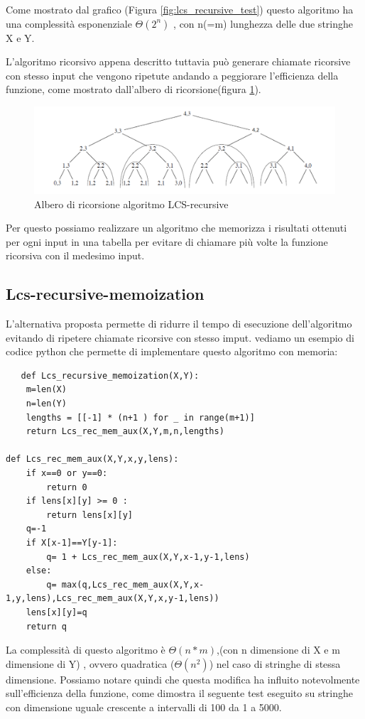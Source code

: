 \documentclass[11pt,a4paper]{article}
\begin{document}
Come mostrato dal grafico (Figura \ref{fig:lcs_recursive_test}) questo algoritmo ha una complessità esponenziale $\Theta(2^n)$ , con n(=m) lunghezza delle due stringhe X e  Y.

L'algoritmo ricorsivo appena descritto tuttavia può generare chiamate ricorsive con stesso input che vengono ripetute andando a peggiorare l'efficienza della funzione, come mostrato dall'albero di ricorsione(figura \ref{fig:lcs_recursion_tree}).

\begin{figure}[htbp]
    \centering
    \includegraphics[width=\textwidth]{Lcs recursion tree.png}
    \caption{Albero di ricorsione algoritmo LCS-recursive}
    \label{fig:lcs_recursion_tree}
\end{figure}

Per questo possiamo realizzare un algoritmo che memorizza i risultati ottenuti per ogni input in una tabella per evitare di chiamare più volte la funzione ricorsiva con il medesimo input.
\subsection{Lcs-recursive-memoization}
L'alternativa proposta permette di ridurre il tempo di esecuzione dell'algoritmo evitando di ripetere chiamate ricorsive con stesso imput. vediamo un esempio di codice python che permette di implementare questo algoritmo con memoria:
\newpage
\begin{lstlisting}
   def Lcs_recursive_memoization(X,Y):
    m=len(X)
    n=len(Y)
    lengths = [[-1] * (n+1 ) for _ in range(m+1)]
    return Lcs_rec_mem_aux(X,Y,m,n,lengths)

def Lcs_rec_mem_aux(X,Y,x,y,lens):
    if x==0 or y==0:
        return 0
    if lens[x][y] >= 0 :
        return lens[x][y] 
    q=-1
    if X[x-1]==Y[y-1]:
        q= 1 + Lcs_rec_mem_aux(X,Y,x-1,y-1,lens)
    else: 
        q= max(q,Lcs_rec_mem_aux(X,Y,x-1,y,lens),Lcs_rec_mem_aux(X,Y,x,y-1,lens))
    lens[x][y]=q
    return q
\end{lstlisting}

La complessità di questo algoritmo è $\Theta(n*m)$,(con n dimensione di X e m dimensione di Y) , ovvero quadratica ($\Theta(n^2)$) nel caso di stringhe di stessa dimensione. Possiamo notare quindi che questa modifica ha influito notevolmente sull'efficienza della funzione, come dimostra il seguente test eseguito su stringhe con dimensione uguale crescente a intervalli di 100 da 1 a 5000. 
\end{document}
